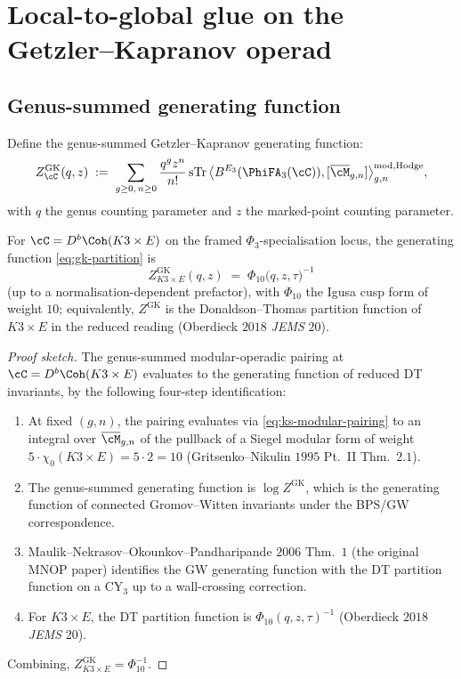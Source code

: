 \section{Local-to-global glue on the Getzler--Kapranov operad}
\label{sec:local-to-global-gk}

\subsection*{Genus-summed generating function}

Define the genus-summed Getzler--Kapranov generating function:
\begin{equation}
\label{eq:gk-partition}
 Z^{\mathrm{GK}}_\cC(q, z) \;:=\; \sum_{g \geq 0,\, n \geq 0}
 \frac{q^g z^n}{n!}\,
 \mathrm{sTr}\,\bigl\langle B^{E_3}(\PhiFA_3(\cC)),
 [\overline{\cM}_{g, n}]\bigr\rangle^{\mathrm{mod, Hodge}}_{g, n},
\end{equation}
with $q$ the genus counting parameter and $z$ the marked-point counting
parameter.

\begin{proposition}[Generating function = partition function]
\label{prop:gk-partition-bkm}
For $\cC = D^b\Coh(K3 \times E)$ on the framed $\Phi_3$-specialisation
locus, the generating function \eqref{eq:gk-partition} is
\[
 Z^{\mathrm{GK}}_{K3 \times E}(q, z) \;=\; \Phi_{10}\bigl(q, z, \tau\bigr)^{-1}
\]
(up to a normalisation-dependent prefactor), with $\Phi_{10}$ the Igusa
cusp form of weight $10$; equivalently, $Z^{\mathrm{GK}}$ is the
Donaldson--Thomas partition function of $K3 \times E$ in the reduced
reading (Oberdieck $2018$ \emph{JEMS} $20$).
\end{proposition}

\begin{proof}[Proof sketch]
The genus-summed modular-operadic pairing at $\cC = D^b\Coh(K3 \times E)$
evaluates to the generating function of reduced DT invariants, by the
following four-step identification:
\begin{enumerate}[label=\textup{(\roman*)}]
\item At fixed $(g, n)$, the pairing evaluates via \eqref{eq:ks-modular-pairing}
to an integral over $\overline{\cM}_{g, n}$ of the pullback of a
Siegel modular form of weight $5 \cdot \chi_0(K3 \times E) = 5 \cdot 2 = 10$
(Gritsenko--Nikulin $1995$ Pt.~II Thm.~$2.1$).
\item The genus-summed generating function is $\log Z^{\mathrm{GK}}$,
which is the generating function of connected Gromov--Witten invariants
under the BPS/GW correspondence.
\item Maulik--Nekrasov--Okounkov--Pandharipande $2006$ Thm.~$1$ (the
original MNOP paper) identifies the GW generating function with the DT
partition function on a CY$_3$ up to a wall-crossing correction.
\item For $K3 \times E$, the DT partition function is
$\Phi_{10}(q, z, \tau)^{-1}$ (Oberdieck $2018$ \emph{JEMS} $20$).
\end{enumerate}
Combining, $Z^{\mathrm{GK}}_{K3 \times E} = \Phi_{10}^{-1}$.
\end{proof}

